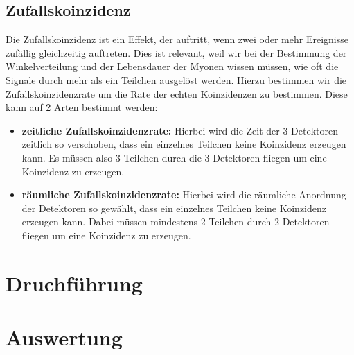 \documentclass{article}
\begin{document}
\subsection{Zufallskoinzidenz} 
Die Zufallskoinzidenz ist ein Effekt, der auftritt, wenn zwei oder mehr Ereignisse zufällig gleichzeitig auftreten. 
Dies ist relevant, weil wir bei der Bestimmung der Winkelverteilung und der Lebensdauer der Myonen wissen müssen, wie oft die Signale durch mehr als ein Teilchen
ausgelöst werden. Hierzu bestimmen wir die Zufallskoinzidenzrate um die Rate der echten Koinzidenzen zu bestimmen.
Diese kann auf 2 Arten bestimmt werden:
\begin{itemize}
    \item \textbf{zeitliche Zufallskoinzidenzrate:} Hierbei wird die Zeit der 3 Detektoren zeitlich so verschoben, dass ein einzelnes Teilchen keine Koinzidenz erzeugen kann.
        Es müssen also 3 Teilchen durch die 3 Detektoren fliegen um eine Koinzidenz zu erzeugen.
    \item \textbf{räumliche Zufallskoinzidenzrate:} Hierbei wird die räumliche Anordnung der Detektoren so gewählt, dass ein einzelnes Teilchen keine Koinzidenz erzeugen kann.
        Dabei müssen mindestens 2 Teilchen durch 2 Detektoren fliegen um eine Koinzidenz zu erzeugen.
\end{itemize}   

\section{Druchführung}

\section{Auswertung}

\newpage
\printbibliography[heading=bibintoc]
\end{document}
